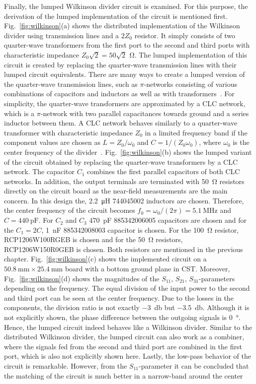 Finally, the lumped Wilkinson divider circuit is examined. For this purpose, the derivation of the lumped implementation of the circuit is mentioned first. Fig.~\ref{fig:wilkinson}(a) shows the distributed implementation of the Wilkinson divider using transmission lines and a $2Z_0$ resistor. It simply consists of two quarter-wave transformers from the first port to the second and third ports with characteristic impedance $Z_0\sqrt{2} = 50\sqrt{2}\,\SI{}{\ohm}$. The lumped implementation of this circuit is created by replacing the quarter-wave transmission lines with their lumped circuit equivalents. There are many ways to create a lumped version of the quarter-wave transmission lines, such as $\pi$-networks consisting of various combinations of capacitors and inductors as well as with transformers~\cite{9422969}. For simplicity, the quarter-wave transformers are approximated by a CLC network, which is a $\pi$-network with two parallel capacitances towards ground and a series inductor between them. A CLC network behaves similarly to a quarter-wave transformer with characteristic impedance $Z_0$ in a limited frequency band if the component values are chosen as $L = Z_0/\omega_0$ and $C = 1/(Z_0\omega_0)$, where $\omega_0$ is the center frequency of the divider~\cite{9422969}. Fig.~\ref{fig:wilkinson}(b) shows the lumped variant of the circuit obtained by replacing the quarter-wave transformers by a CLC network. The capacitor $C_1$ combines the first parallel capacitors of both CLC networks. In addition, the output terminals are terminated with \SI{50}{\ohm} resistors directly on the circuit board as the near-field measurements are the main concern. In this design the, \SI{2.2}{\micro\henry} 744045002 inductors are chosen. Therefore, the center frequency of the circuit becomes $f_0 = \omega_0/(2\pi) = \SI{5.1}{\mega\hertz}$ and $C = \SI{440}{\pico\farad}$. For $C_2$ and $C_3$ \SI{470}{\pico\farad} 885342006005 capacitors are chosen and for the $C_1 = 2C$, \SI{1}{\nano\farad} 885342008003 capacitor is chosen. For the \SI{100}{\ohm} resistor, RCP1206W100RGEB is chosen and for the \SI{50}{\ohm} resistors, RCP1206W150R0GEB is chosen. Both resistors are mentioned in the previous chapter. Fig.~\ref{fig:wilkinson}(c) shows the implemented circuit on a $\SI{50.8}{\milli\meter} \times \SI{25.4}{\milli\meter}$ board with a bottom ground plane in CST. Moreover, Fig.~\ref{fig:wilkinson}(d) shows the magnitudes of the $S_{11}$, $S_{21}$, $S_{31}$-parameters depending on the frequency. The equal division of the input power to the second and third port can be seen at the center frequency. Due to the losses in the components, the division ratio is not exactly \SI{-3}{\decibel} but \SI{-3.5}{\decibel}. Although it is not explicitly shown, the phase difference between the outgoing signals is \SI{0}{\degree}. Hence, the lumped circuit indeed behaves like a Wilkinson divider. Similar to the distributed Wilkinson divider, the lumped circuit can also work as a combiner, where the signals fed from the second and third port are combined in the first port, which is also not explicitly shown here. Lastly, the low-pass behavior of the circuit is remarkable. However, from the $S_{11}$-parameter it can be concluded that the matching of the circuit is much better in a narrow-band around the center 